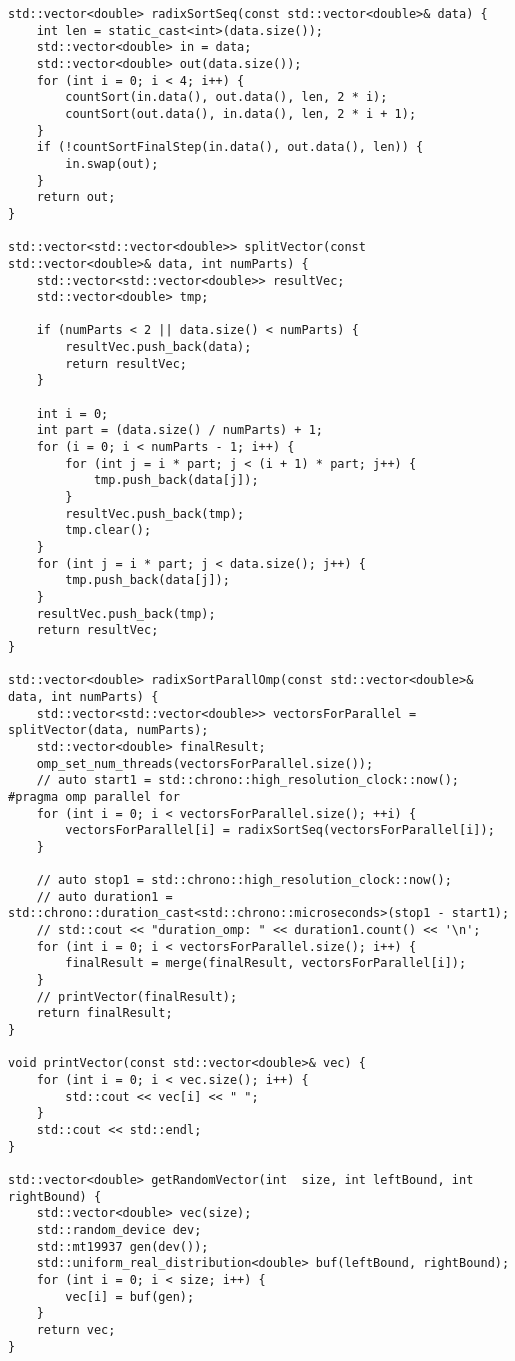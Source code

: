 \documentclass{article}
\begin{document}
\begin{verbatim}
std::vector<double> radixSortSeq(const std::vector<double>& data) {
    int len = static_cast<int>(data.size());
    std::vector<double> in = data;
    std::vector<double> out(data.size());
    for (int i = 0; i < 4; i++) {
        countSort(in.data(), out.data(), len, 2 * i);
        countSort(out.data(), in.data(), len, 2 * i + 1);
    }
    if (!countSortFinalStep(in.data(), out.data(), len)) {
        in.swap(out);
    }
    return out;
}

std::vector<std::vector<double>> splitVector(const std::vector<double>& data, int numParts) {
    std::vector<std::vector<double>> resultVec;
    std::vector<double> tmp;

    if (numParts < 2 || data.size() < numParts) {
        resultVec.push_back(data);
        return resultVec;
    }

    int i = 0;
    int part = (data.size() / numParts) + 1;
    for (i = 0; i < numParts - 1; i++) {
        for (int j = i * part; j < (i + 1) * part; j++) {
            tmp.push_back(data[j]);
        }
        resultVec.push_back(tmp);
        tmp.clear();
    }
    for (int j = i * part; j < data.size(); j++) {
        tmp.push_back(data[j]);
    }
    resultVec.push_back(tmp);
    return resultVec;
}

std::vector<double> radixSortParallOmp(const std::vector<double>& data, int numParts) {
    std::vector<std::vector<double>> vectorsForParallel = splitVector(data, numParts);
    std::vector<double> finalResult;
    omp_set_num_threads(vectorsForParallel.size());
    // auto start1 = std::chrono::high_resolution_clock::now();
#pragma omp parallel for
    for (int i = 0; i < vectorsForParallel.size(); ++i) {
        vectorsForParallel[i] = radixSortSeq(vectorsForParallel[i]);
    }

    // auto stop1 = std::chrono::high_resolution_clock::now();
    // auto duration1 = std::chrono::duration_cast<std::chrono::microseconds>(stop1 - start1);
    // std::cout << "duration_omp: " << duration1.count() << '\n';
    for (int i = 0; i < vectorsForParallel.size(); i++) {
        finalResult = merge(finalResult, vectorsForParallel[i]);
    }
    // printVector(finalResult);
    return finalResult;
}

void printVector(const std::vector<double>& vec) {
    for (int i = 0; i < vec.size(); i++) {
        std::cout << vec[i] << " ";
    }
    std::cout << std::endl;
}

std::vector<double> getRandomVector(int  size, int leftBound, int rightBound) {
    std::vector<double> vec(size);
    std::random_device dev;
    std::mt19937 gen(dev());
    std::uniform_real_distribution<double> buf(leftBound, rightBound);
    for (int i = 0; i < size; i++) {
        vec[i] = buf(gen);
    }
    return vec;
}


\end{verbatim}
\end{document}
